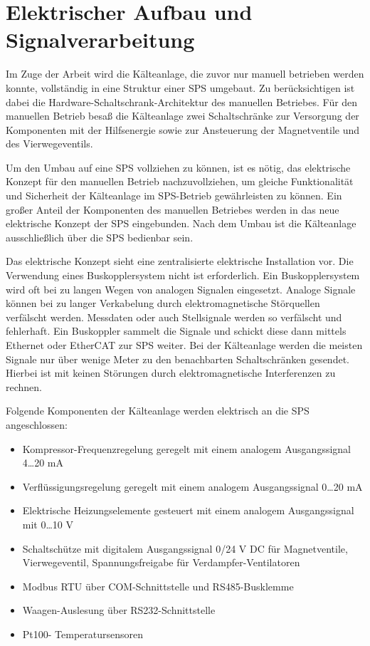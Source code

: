 \newpage
\section{Elektrischer Aufbau und Signalverarbeitung}
\label{sec:Elektrischer Aufbau}
Im Zuge der Arbeit wird die Kälteanlage, die zuvor nur manuell betrieben werden konnte, vollständig in eine Struktur einer SPS umgebaut. Zu berücksichtigen ist dabei die Hardware-Schaltschrank-Architektur des manuellen Betriebes. Für den manuellen Betrieb besaß die Kälteanlage zwei Schaltschränke zur Versorgung der Komponenten mit der Hilfsenergie sowie zur Ansteuerung der Magnetventile und des Vierwegeventils.

Um den Umbau auf eine SPS vollziehen zu können, ist es nötig, das elektrische Konzept für den manuellen Betrieb nachzuvollziehen, um  gleiche Funktionalität und Sicherheit der Kälteanlage im SPS-Betrieb gewährleisten zu können. Ein großer Anteil der Komponenten des manuellen Betriebes werden in das neue elektrische Konzept der SPS eingebunden. Nach dem Umbau ist die Kälteanlage ausschließlich über die SPS bedienbar sein.

Das elektrische Konzept sieht eine zentralisierte elektrische Installation vor. Die Verwendung eines Buskopplersystem nicht ist erforderlich. Ein Buskopplersystem wird oft bei zu langen Wegen von analogen Signalen eingesetzt. Analoge Signale können bei zu langer Verkabelung durch elektromagnetische Störquellen verfälscht werden. Messdaten oder auch Stellsignale werden so verfälscht und fehlerhaft. Ein Buskoppler sammelt die Signale und schickt diese dann mittels Ethernet oder EtherCAT zur SPS weiter. 
Bei der Kälteanlage werden die meisten Signale nur über wenige Meter zu den benachbarten Schaltschränken gesendet. Hierbei ist mit keinen Störungen durch elektromagnetische Interferenzen zu rechnen.
 
Folgende Komponenten der Kälteanlage werden elektrisch an die SPS angeschlossen: 
\begin{itemize}
\item	Kompressor-Frequenzregelung geregelt mit einem analogem Ausgangssignal 4\dots 20 mA
\item	Verflüssigungsregelung geregelt mit einem analogem Ausgangssignal  0\dots 20 mA
\item	Elektrische Heizungselemente gesteuert mit einem analogem Ausgangssignal mit 0\dots 10 V
\item	Schaltschütze mit digitalem Ausgangssignal 0/24 V DC für Magnetventile, Vierwegeventil, Spannungsfreigabe für Verdampfer-Ventilatoren
\item 	Modbus RTU über COM-Schnittstelle und RS485-Busklemme
\item 	Waagen-Auslesung über RS232-Schnittstelle
\item 	Pt100- Temperatursensoren
\end{itemize}
 
